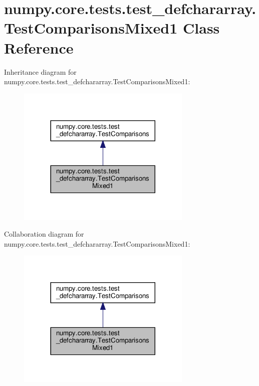 \hypertarget{classnumpy_1_1core_1_1tests_1_1test__defchararray_1_1TestComparisonsMixed1}{}\section{numpy.\+core.\+tests.\+test\+\_\+defchararray.\+Test\+Comparisons\+Mixed1 Class Reference}
\label{classnumpy_1_1core_1_1tests_1_1test__defchararray_1_1TestComparisonsMixed1}


Inheritance diagram for numpy.\+core.\+tests.\+test\+\_\+defchararray.\+Test\+Comparisons\+Mixed1\+:
\nopagebreak
\begin{figure}[H]
\begin{center}
\leavevmode
\includegraphics[width=236pt]{classnumpy_1_1core_1_1tests_1_1test__defchararray_1_1TestComparisonsMixed1__inherit__graph}
\end{center}
\end{figure}


Collaboration diagram for numpy.\+core.\+tests.\+test\+\_\+defchararray.\+Test\+Comparisons\+Mixed1\+:
\nopagebreak
\begin{figure}[H]
\begin{center}
\leavevmode
\includegraphics[width=236pt]{classnumpy_1_1core_1_1tests_1_1test__defchararray_1_1TestComparisonsMixed1__coll__graph}
\end{center}
\end{figure}
